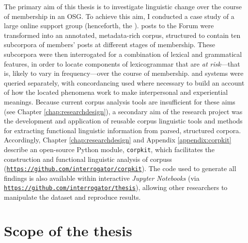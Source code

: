 The primary aim of this thesis is to investigate linguistic change over the course of membership in an \gls{OSG}. To achieve this aim, I conducted a case study of a large online  support group (henceforth, the \emph{}). \Glspl{post} to the \gls{Forum} were transformed into an annotated, metadata\hyp{}rich \gls{corpus}, structured to contain ten subcorpora of \glspl{member}' \glspl{post} at different stages of membership. These subcorpora were then interrogated for a combination of lexical and grammatical features, in order to locate components of \gls{lexicogrammar} that are \emph{at risk}---that is, likely to vary in frequency---over the course of membership.  and  systems were queried separately, with concordancing used where necessary to build an account of how the located  phenomena work to make interpersonal and experiential meanings. Because current corpus analysis tools are insufficient for these aims (see Chapter \ref{chap:researchdesign}), a secondary aim of the research project was the development and application of reusable corpus linguistic tools and methods for extracting functional linguistic information from parsed, structured corpora. Accordingly, Chapter \ref{chap:researchdesign} and Appendix \ref{appendix:corpkit} describe an open\hyp{}source Python module, \texttt{corpkit}, which facilitates the construction and functional linguistic analysis of \glspl{corpus} (\texttt{\url{https://github.com/interrogator/corpkit}}). The code used to generate all findings is also available within interactive \emph{Jupyter Notebooks} (via \texttt{\url{https://github.com/interrogator/thesis}}), allowing other researchers to manipulate the dataset and reproduce results.

\section{Scope of the thesis}

